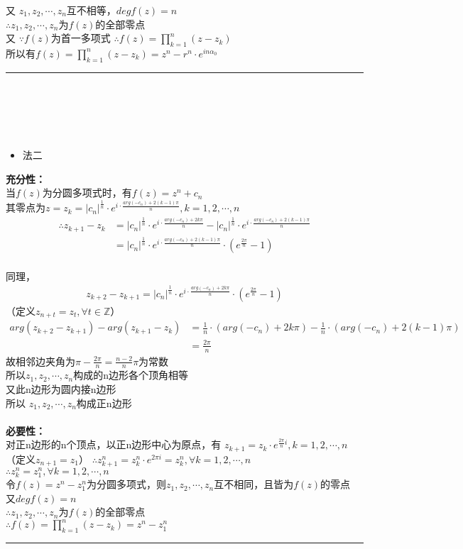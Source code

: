 \documentclass[18pt]{article}
\begin{document}
又 $z_{1},z_{2},\cdots,z_{n}$互不相等，$degf(z)=n$\\
$\therefore z_{1},z_{2},\cdots,z_{n}$为$f(z)$的全部零点\\
又 $\because f(z)$为首一多项式
$\therefore f(z)=\prod_{k=1}^{n}(z-z_{k})$\\
所以有$f(z)=\prod_{k=1}^{n}(z-z_{k})=z^{n}-r^{n}\cdot e^{in\alpha_{0}}$ \quad \rule{3mm}{3mm}\\
\\
\\
\\
\begin{itemize}
	\item 法二
\end{itemize}
\textbf{充分性：}\\
当$f(z)$为分圆多项式时，有$f(z)=z^{n}+c_{n}$\\
其零点为$z=z_{k}=|c_{n}|^{\frac{1}{n}}\cdot e^{i\cdot\frac{arg(-c_{n})+2(k-1)\pi}{n}},k=1,2,\cdots,n$\\
\begin{align*}
\therefore z_{k+1}-z_{k} &=|c_{n}|^{\frac{1}{n}}\cdot e^{i\cdot\frac{arg(-c_{n})+2k\pi}{n}}-|c_{n}|^{\frac{1}{n}}\cdot e^{i\cdot\frac{arg(-c_{n})+2(k-1)\pi}{n}} \\
&=|c_{n}|^{\frac{1}{n}}\cdot e^{i\cdot\frac{arg(-c_{n})+2(k-1)\pi}{n}} \cdot (e^{\frac{2\pi}{n}}-1)
\end{align*}\\
同理，
\begin{align*}
z_{k+2}-z_{k+1}=|c_{n}|^{\frac{1}{n}}\cdot e^{i\cdot\frac{arg(-c_{n})+2k\pi}{n}} \cdot (e^{\frac{2\pi}{n}}-1)
\end{align*}
（定义$z_{n+t}=z_{t},\forall t \in \mathbb{Z}$）
\begin{align*}
	arg(z_{k+2}-z_{k+1})-arg(z_{k+1}-z_{k})&=\frac{1}{n}\cdot (arg(-c_{n})+2k\pi)-\frac{1}{n}\cdot (arg(-c_{n})+2(k-1)\pi)\\
	&=\frac{2\pi}{n}
\end{align*}
故相邻边夹角为$\pi-\frac{2\pi}{n}=\frac{n-2}{n}\pi$为常数\\
所以\quad$z_{1},z_{2},\cdots,z_{n}$构成的n边形各个顶角相等\\
又\quad 此n边形为圆内接n边形\\
所以 $z_{1},z_{2},\cdots,z_{n}$构成正n边形\\
\\
\textbf{必要性：}\\
对正n边形的n个顶点，以正n边形中心为原点，有
$z_{k+1}=z_{k}\cdot e^{\frac{2\pi}{n}i},k=1,2,\cdots,n$\\
（定义$z_{n+1}=z_{1}$）
$\therefore z_{k+1}^{n}=z_{k}^{n}\cdot e^{2\pi i}=z_{k}^{n},\forall k=1,2,\cdots,n$\\
$\therefore z_{k}^{n}=z_{1}^{n},\forall k=1,2,\cdots,n$\\
令$f(z)=z^{n}-z_{1}^{n}$为分圆多项式，则$z_{1},z_{2},\cdots,z_{n}$互不相同，且皆为$f(z)$的零点\\
又\quad $degf(z)=n$\\
$\therefore z_{1},z_{2},\cdots,z_{n}$为$f(z)$的全部零点\\
$\therefore f(z)=\prod_{k=1}^{n}(z-z_{k})=z^{n}-z_{1}^{n}$ \quad \rule{3mm}{3mm}\\
\end{document}
